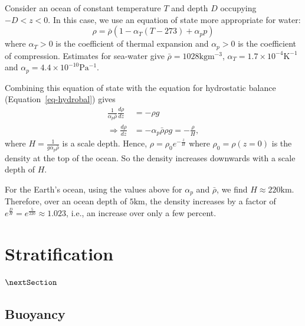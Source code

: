 \documentclass[
  letterpaper,
  twocolumn,
  landscape]{report}
\begin{document}
\begin{tcolorbox}[enhanced jigsaw, left=2mm, opacityback=0, coltitle=black, bottomtitle=1mm, title={Example}, toprule=.15mm, colbacktitle=quarto-callout-tip-color!10!white, breakable, arc=.35mm, titlerule=0mm, colback=white, toptitle=1mm, opacitybacktitle=0.6, rightrule=.15mm, bottomrule=.15mm, colframe=quarto-callout-tip-color-frame, leftrule=.75mm]

Consider an ocean of constant temperature \(T\) and depth \(D\)
occupying \(-D<z<0\). In this case, we use an equation of state more
appropriate for water: \begin{equation}
\rho=\bar\rho(1-\alpha_T(T-273) + \alpha_p p)
\end{equation} where \(\alpha_T>0\) is the coefficient of thermal
expansion and \(\alpha_p>0\) is the coefficient of compression.
Estimates for sea-water give \(\bar\rho=1028\mathrm{kgm^{-3}}\),
\(\alpha_T=1.7\times10^{-4}\mathrm{K^{-1}}\) and
\(\alpha_p=4.4\times10^{-10}\mathrm{Pa^{-1}}\).

Combining this equation of state with the equation for hydrostatic
balance (Equation~\ref{eq-hydrobal}) gives \begin{align}
\frac{1}{\alpha_p\bar\rho}\frac{d\rho}{dz}&=-\rho g\\
\Rightarrow \frac{d\rho}{dz} &= -\alpha_p\bar\rho\rho g = -\frac{\rho}{H},
\end{align} where \(H=\frac{1}{g\alpha_p\bar\rho}\) is a scale depth.
Hence, \(\rho=\rho_0e^{-\frac{z}{H}}\) where \(\rho_0=\rho(z=0)\) is the
density at the top of the ocean. So the density increases downwards with
a scale depth of \(H\).

For the Earth's ocean, using the values above for \(\alpha_p\) and
\(\bar\rho\), we find \(H\approx 220\mathrm{km}\). Therefore, over an
ocean depth of \(5\mathrm{km}\), the density increases by a factor of
\(e^{\frac{D}{H}}=e^{\frac{5}{220}}\approx 1.023\), i.e., an increase
over only a few percent.

\end{tcolorbox}

\hypertarget{sec-chap:strat}{%
\chapter{Stratification}\label{sec-chap:strat}}

\(\nextSection\)

\hypertarget{buoyancy}{%
\section{Buoyancy}\label{buoyancy}}
\end{document}
